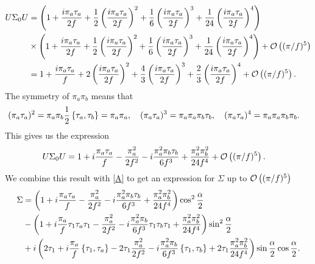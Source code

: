 \begin{align*}
    U\Sigma_0U & = 
    \left(
        1
        + \frac{i \pi_a \tau_a}{2f} 
        + \frac{1}{2}\left(\frac{i \pi_a \tau_a}{2f}\right)^2 
        + \frac{1}{6}\left(\frac{i \pi_a \tau_a}{2f}\right)^3 
        + \frac{1}{24}\left(\frac{i \pi_a \tau_a}{2f}\right)^4 
    \right)\\
    & \times
    \left(
        1
        + \frac{i \pi_a \tau_a}{2f} 
        + \frac{1}{2}\left(\frac{i \pi_a \tau_a}{2f}\right)^2 
        + \frac{1}{6}\left(\frac{i \pi_a \tau_a}{2f}\right)^3 
        + \frac{1}{24}\left(\frac{i \pi_a \tau_a}{2f}\right)^4 
    \right)
    + \Oh[5]{(\pi/f)}\\
    &=
    1 + \frac{i \pi_a \tau_a}{f}
    + 2 \left( \frac{i \pi_a \tau_a}{2f} \right)^2
    + \frac{4}{3} \left( \frac{i \pi_a \tau_a}{2f} \right)^3
    + \frac{2}{3} \left( \frac{i \pi_a \tau_a}{2f} \right)^4
    + \Oh[5]{(\pi/f)}.
\end{align*}
The symmetry of $\pi_a\pi_b$ means that
\begin{align*}
    & (\pi_a \tau_a)^2
    = 
    \pi_a \pi_b \frac{1}{2} \acom{\tau_a}{\tau_b} 
    =
    \pi_a \pi_a, \quad
    (\pi_a \tau_a)^3
    =
    \pi_a \pi_a \pi_b \tau_b,\quad
    (\pi_a \tau_a)^4
    =
    \pi_a \pi_a \pi_b \pi_b.
\end{align*}
This gives us the expression
\begin{align*}
    & U\Sigma_0U 
    =
    1
    + i \frac{\pi_a \tau_a}{f} 
    - \frac{\pi_a^2}{2f^2}
    - i \frac{\pi_a^2\pi_b \tau_b}{6f^3}
    + \frac{\pi_a^2\pi_b^2}{24f^4}
    + \Oh[5]{(\pi/f)}.
\end{align*}
We combine this result with \autoref{A} to get an expression for $\Sigma$ up to $\Oh[5]{(\pi/f)}$
\begin{align*}
    \Sigma 
    & =
    \left(
        1
        + i \frac{\pi_a \tau_a}{f} 
        - \frac{\pi_a^2}{2f^2}
        - i \frac{\pi_a^2\pi_b \tau_b}{6f^3}
        + \frac{\pi_a^2\pi_b^2}{24f^4}    
    \right)
    \cos^2{\frac{\alpha}{2}} \\
    & -
    \left(
        1
        + i \frac{\pi_a}{f} \tau_1\tau_a\tau_1
        - \frac{\pi_a^2}{2f^2}
        - i \frac{\pi_a^2\pi_b}{6f^3} \tau_1\tau_b\tau_1
        + \frac{\pi_a^2\pi_b^2}{24f^4}
    \right)
    \sin^2{\frac{\alpha}{2}}\\
    & + i
    \left(
        2 \tau_1
        + i \frac{\pi_a}{f} \acom{\tau_1}{\tau_a}
        - 2\tau_1 \frac{\pi_a^2}{2f^2}
        - i \frac{\pi_a^2\pi_b}{6f^3} \acom{\tau_1}{\tau_b}
        + 2\tau_1 \frac{\pi_a^2\pi_b^2}{24f^4}
    \right)
    \sin{\frac{\alpha}{2}}\cos{\frac{\alpha}{2}}.
\end{align*}
